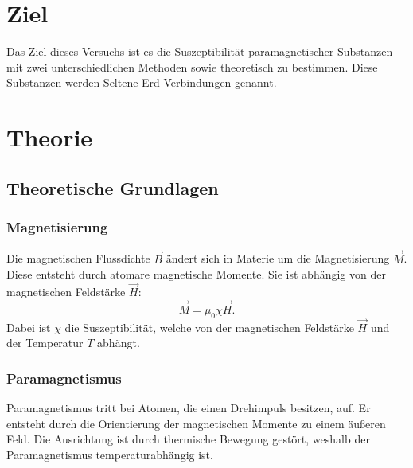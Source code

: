 \section{Ziel}
Das Ziel dieses Versuchs ist es die Suszeptibilität paramagnetischer Substanzen mit
zwei unterschiedlichen Methoden sowie theoretisch zu bestimmen.
Diese Substanzen werden Seltene-Erd-Verbindungen genannt. 

\section{Theorie}
\label{sec:Theorie}


\subsection{Theoretische Grundlagen}

\subsubsection{Magnetisierung}
Die magnetischen Flussdichte $\vec{B}$ ändert sich in Materie um die Magnetisierung $\vec{M}$.
Diese entsteht durch atomare magnetische Momente. %
Sie ist abhängig von der magnetischen Feldstärke $\vec{H}$:
\begin{equation*}
    \vec{M} = \mu_0 \chi \vec{H}.
    \label{eqn:magnetisierung}
\end{equation*}
Dabei ist $\chi$ die Suszeptibilität, welche von der magnetischen Feldstärke $\vec{H}$ und 
der Temperatur $T$ abhängt. 

\subsubsection{Paramagnetismus}
Paramagnetismus tritt bei Atomen, die einen Drehimpuls besitzen, auf. 
Er entsteht durch die Orientierung der magnetischen Momente zu einem äußeren Feld. 
Die Ausrichtung ist durch thermische Bewegung gestört, weshalb der Paramagnetismus 
temperaturabhängig ist. 


